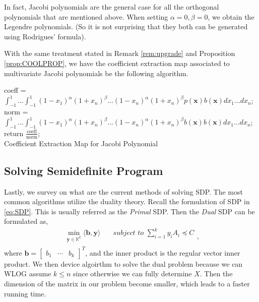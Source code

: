 \documentclass[12pt]{amsart}
\numberwithin{equation}{section}
\theoremstyle{definition}
\numberwithin{thm}{section}
\begin{document}
In fact, Jacobi polynomials are the general case for all the orthogonal polynomials that are mentioned above. 
When setting $\alpha = 0, \beta = 0$, we obtain the Legendre polynomials. (So it is not surprising that they both can be generated using Rodrigues' formula).

With the same treatment stated in Remark \ref{rem:upgrade} and Proposition \ref{prop:COOLPROP},
we have the {coefficient extraction map} associated to multivariate Jacobi polynomials be the following algorithm.

\begin{algorithm}[H]
     \SetAlgoLined
     coeff = $\int_{-1}^1 ... \int_{-1}^1 (1-x_1)^{\alpha} (1+x_n)^{\beta} ... (1-x_n)^{\alpha} (1+x_n)^{\beta} p(\mathbf{x})b(\mathbf{x}) dx_1 ... dx_n$;\\
     norm = $\int_{-1}^1 ... \int_{-1}^1 (1-x_1)^{\alpha} (1+x_n)^{\beta} ... (1-x_n)^{\alpha} (1+x_n)^{\beta} b(\mathbf{x}) b(\mathbf{x}) dx_1 ... dx_n$;\\
     return $\frac{\text{coeff}}{\text{norm}}$;\\
     \caption{Coefficient Extraction Map for Jacobi Polynomial}
\end{algorithm}


\subsection{Solving Semidefinite Program}
\label{Sec:Solving Semidefinite Program}
Lastly, we survey on what are the current methods of solving SDP.
The most common algorithms utilize the duality theory. 
Recall the formulation of SDP in \eqref{eq:SDP}. This is usually referred as the \emph{Primal} SDP.
Then the \emph{Dual} SDP can be formulated as, 
\begin{equation*}
     \begin{split}
          \min_{\mathbf{y} \in \mathbb{R}^k} \langle \mathbf{b}, \mathbf{y} \rangle & \quad \textit{subject to } \sum_{i=1}^k y_i A_i \preccurlyeq C \\
     \end{split},
\end{equation*}
where $\mathbf{b} = \begin{bmatrix}
     b_1 & \cdots & b_k
\end{bmatrix}^T$, and the inner product is the regular vector inner product.
We then device algoirthm to solve the dual problem because we can WLOG assume $k \leq n$ since otherwise we can fully determine $X$. 
Then the dimension of the matrix in our problem become smaller, which leads to a faster running time. 
\end{document}
